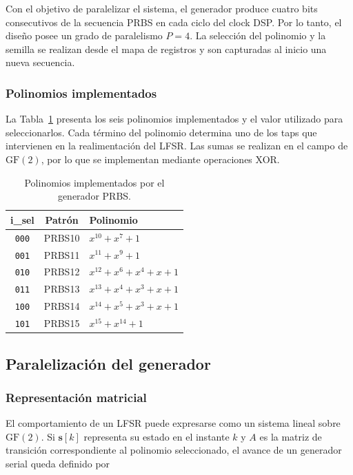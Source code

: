 \documentclass[10pt,a4paper]{article}
\begin{document}
Con el objetivo de paralelizar el sistema, el generador produce cuatro bits consecutivos 
de la secuencia PRBS en cada ciclo del clock DSP. Por lo tanto, el diseño posee un grado 
de paralelismo $P=4$. La selección del polinomio y la semilla se realizan desde el mapa 
de registros y son capturadas al inicio una nueva secuencia.

\subsubsection*{Polinomios implementados}

La Tabla~\ref{tab:prbs-polinomios} presenta los seis polinomios implementados y el
valor utilizado para seleccionarlos. Cada término del polinomio determina uno de los
taps que intervienen en la realimentación del LFSR. Las sumas se realizan en el campo
de $\mathrm{GF}(2)$, por lo que se implementan mediante operaciones XOR.

\begin{table}[H]
    \centering
    \caption{Polinomios implementados por el generador PRBS.}
    \label{tab:prbs-polinomios}
    \begin{tabular}{ccl}
        \toprule
        \textbf{i\_sel} & \textbf{Patrón} & \textbf{Polinomio} \\
        \midrule
        \texttt{000} & PRBS10 & $x^{10}+x^7+1$ \\
        \texttt{001} & PRBS11 & $x^{11}+x^9+1$ \\
        \texttt{010} & PRBS12 & $x^{12}+x^6+x^4+x+1$ \\
        \texttt{011} & PRBS13 & $x^{13}+x^4+x^3+x+1$ \\
        \texttt{100} & PRBS14 & $x^{14}+x^5+x^3+x+1$ \\
        \texttt{101} & PRBS15 & $x^{15}+x^{14}+1$ \\
        \bottomrule
    \end{tabular}
\end{table}

\subsection{Paralelización del generador}

\subsubsection*{Representación matricial}
El comportamiento de un LFSR puede expresarse como un sistema lineal sobre
$\mathrm{GF}(2)$. Si $\mathbf{s}[k]$ representa su estado en el instante $k$ y $A$ es
la matriz de transición correspondiente al polinomio seleccionado, el avance de un
generador serial queda definido por
\end{document}
